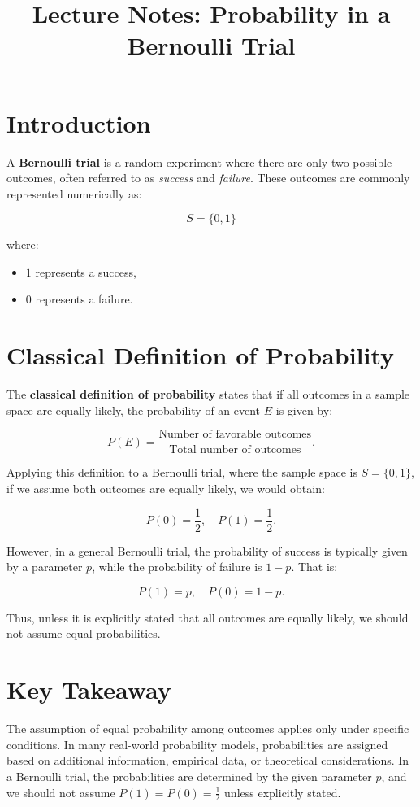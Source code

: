 \documentclass[12pt]{article}
\title{Lecture Notes: Probability in a Bernoulli Trial}
\author{}
\date{}
\begin{document}
\maketitle

\section{Introduction}
A \textbf{Bernoulli trial} is a random experiment where there are only two possible outcomes, often referred to as \emph{success} and \emph{failure}. These outcomes are commonly represented numerically as:

\begin{equation*}
    S = \{0,1\}
\end{equation*}

where:
\begin{itemize}
    \item $1$ represents a success,
    \item $0$ represents a failure.
\end{itemize}

\section{Classical Definition of Probability}
The \textbf{classical definition of probability} states that if all outcomes in a sample space are equally likely, the probability of an event $E$ is given by:

\begin{equation}
    P(E) = \frac{\text{Number of favorable outcomes}}{\text{Total number of outcomes}}.
\end{equation}

Applying this definition to a Bernoulli trial, where the sample space is $S = \{0,1\}$, if we assume both outcomes are equally likely, we would obtain:

\begin{equation*}
    P(0) = \frac{1}{2}, \quad P(1) = \frac{1}{2}.
\end{equation*}

However, in a general Bernoulli trial, the probability of success is typically given by a parameter $p$, while the probability of failure is $1 - p$. That is:

\begin{equation}
    P(1) = p, \quad P(0) = 1 - p.
\end{equation}

Thus, unless it is explicitly stated that all outcomes are equally likely, we should not assume equal probabilities.

\section{Key Takeaway}
The assumption of equal probability among outcomes applies only under specific conditions. In many real-world probability models, probabilities are assigned based on additional information, empirical data, or theoretical considerations. In a Bernoulli trial, the probabilities are determined by the given parameter $p$, and we should not assume $P(1) = P(0) = \frac{1}{2}$ unless explicitly stated.
\end{document}

